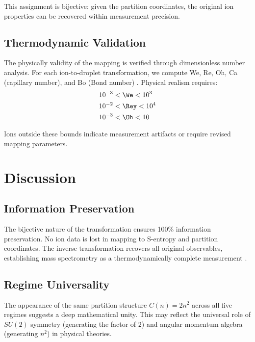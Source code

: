 This assignment is bijective: given the partition coordinates, the original ion properties can be recovered within measurement precision.

\subsection{Thermodynamic Validation}

The physically validity of the mapping is verified through dimensionless number analysis. For each ion-to-droplet transformation, we compute We, Re, Oh, Ca (capillary number), and Bo (Bond number) \cite{clift1978bubbles}. Physical realism requires:
\begin{align}
10^{-3} &< \We < 10^3 \\
10^{-2} &< \Rey < 10^4 \\
10^{-3} &< \Oh < 10
\end{align}

Ions outside these bounds indicate measurement artifacts or require revised mapping parameters.

\section{Discussion}
\label{sec:discussion}

\subsection{Information Preservation}

The bijective nature of the transformation ensures 100\% information preservation. No ion data is lost in mapping to S-entropy and partition coordinates. The inverse transformation recovers all original observables, establishing mass spectrometry as a thermodynamically complete measurement \cite{vonneumann1955mathematical, zurek2003decoherence}.

\subsection{Regime Universality}

The appearance of the same partition structure $C(n) = 2n^2$ across all five regimes suggests a deep mathematical unity. This may reflect the universal role of $SU(2)$ symmetry (generating the factor of 2) and angular momentum algebra (generating $n^2$) in physical theories.

